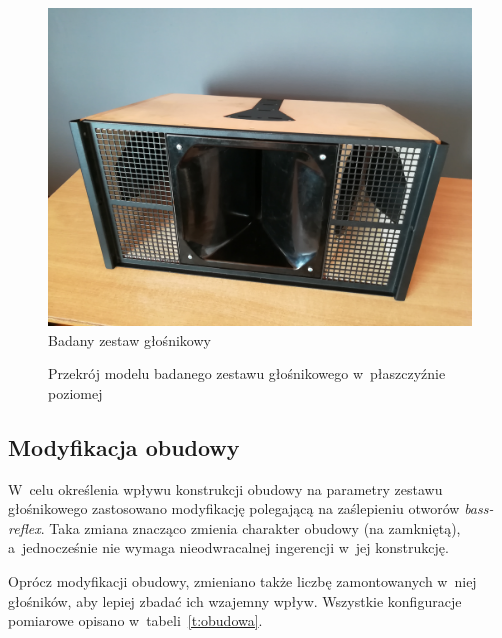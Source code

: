 \documentclass[12pt]{oska}
\begin{document}
	
	\begin{figure}[!ht]
		\centering
		\includegraphics[width=.8\textwidth]{zdjecie.jpg}
		\caption{Badany zestaw głośnikowy}
		\label{r:zdjecie}
	\end{figure}
	
	\begin{figure}[!ht]
		\centering
		\caption{Przekrój modelu badanego zestawu głośnikowego w~płaszczyźnie poziomej}
		\label{r:przekroj}
	\end{figure}
	
	\subsection{Modyfikacja obudowy}
	
	W~celu określenia wpływu konstrukcji obudowy na parametry zestawu głośnikowego zastosowano modyfikację polegającą na zaślepieniu otworów \textit{bass-reflex}. Taka zmiana znacząco zmienia charakter obudowy (na zamkniętą), a~jednocześnie nie wymaga nieodwracalnej ingerencji w~jej konstrukcję.
	
	Oprócz modyfikacji obudowy, zmieniano także liczbę zamontowanych w~niej głośników, aby lepiej zbadać ich wzajemny wpływ. Wszystkie konfiguracje pomiarowe opisano w~tabeli~\ref{t:obudowa}.
	
\end{document}
